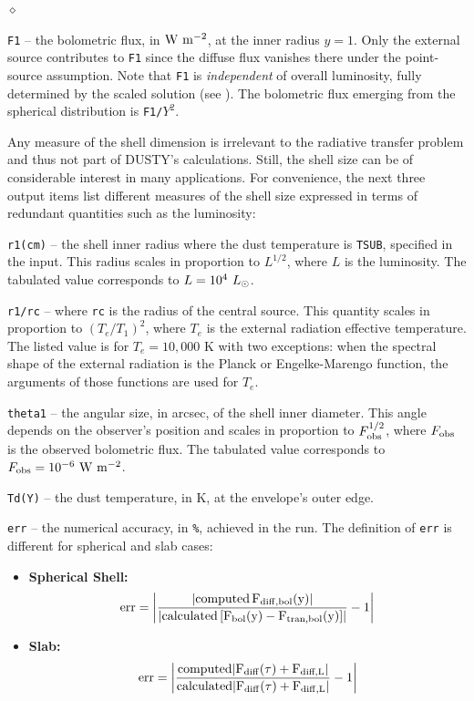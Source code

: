 \documentclass[11pt]{article}
\def\D  {{\sf DUSTY}}
\def\E#1{\hbox{$10^{#1}$}}
\def\Lo     {\hbox{$L_{\odot}$}}
\begin{document}
\begin{list}{$\diamond$}{}
\item
{\tt F1} -- the bolometric flux, in $\rm W\ m^{-2}$, at the inner radius $y =
1$. Only the external source contributes to {\tt F1} since the diffuse flux
vanishes there under the point-source assumption. Note that {\tt F1} is {\em
independent} of overall luminosity, fully determined by the scaled solution
(see \cite{IE97}). The bolometric flux emerging from the spherical distribution
is {\tt F1/$Y^2$}.

Any measure of the shell dimension is irrelevant to the radiative transfer
problem and thus not part of \D's calculations.  Still, the shell size can be
of considerable interest in many applications. For convenience, the next three
output items list different measures of the shell size expressed in terms of
redundant quantities such as the luminosity:

\item
{\tt r1(cm)} -- the shell inner radius where the dust temperature is {\tt TSUB},
specified in the input.  This radius scales in proportion to
$L^{1/2}$, where $L$ is the luminosity. The tabulated value corresponds to $L =
\E4\ \Lo$.

\item
{\tt r1/rc} -- where {\tt rc} is the radius of the central source.  This
quantity scales in proportion to $(T_e/T_1)^2$, where $T_e$ is the external
radiation effective temperature.  The listed value is for $T_e = 10,000$ K with
two exceptions: when the spectral shape of the external radiation is the Planck
or Engelke-Marengo function, the arguments of those functions are used for
$T_e$.

\item
{\tt theta1} -- the angular size, in arcsec, of the shell inner diameter. This
angle depends on the observer's position and scales in proportion to $F_{\rm
obs}^{1/2}$, where $F_{\rm obs}$ is the observed bolometric flux.  The
tabulated value corresponds to $F_{\rm obs} = \E{-6}\ \rm W\ m^{-2}$.

\item
{\tt Td(Y)} -- the dust temperature, in K, at the envelope's outer edge.

\item
{\tt err} -- the numerical accuracy, in {\tt \%}, achieved in the run. The 
definition of {\tt err} is different for spherical and slab cases:
%
\begin{itemize}
%
\item
{\bf Spherical Shell:} 
\begin{equation}
\rm{err} = 
 \left|\frac{{\rm{|computed}}\,F_{\rm{diff,bol}}(y)|}
      {{\rm{|calculated}}\,[F_{\rm{bol}}(y) - F_{\rm{tran, bol}}(y)]|}
       - 1 \right|
\label{fluxconsvsphere2}
\end{equation}
%
\item
{\bf Slab:}
\begin{equation}
\rm{err} = \left|\frac{\mbox{computed}|F_{\rm{diff}}(\tau) + F_{\mbox{\scriptsize
diff},L}|}{\mbox{calculated}|F_{\rm{diff}} (\tau)+ F_{\rm{diff},L}|}
-1 \right|
\end{equation}
%
\end{itemize}


\end{list}
\end{document}
